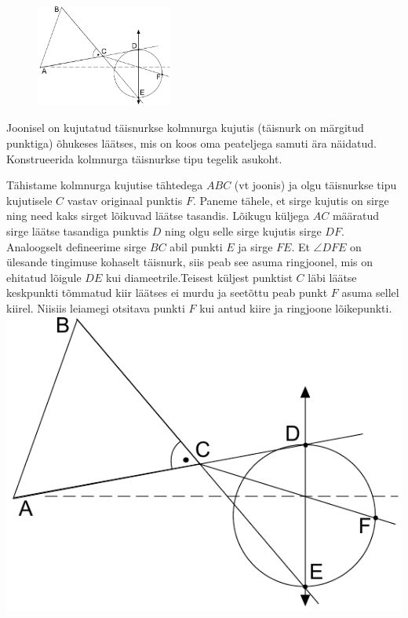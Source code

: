 
\begin{figure}
	\vspace{-30pt}
	\begin{center}
		\hspace{-10pt}
		\includegraphics[width = 0.4\textwidth]{2018-lahg-08-yl.pdf}
	\end{center}
\end{figure}
Joonisel on kujutatud täisnurkse kolmnurga kujutis (täisnurk on märgitud punktiga) õhukeses läätses, mis on koos oma peateljega samuti ära näidatud. Konstrueerida kolmnurga täisnurkse tipu tegelik asukoht.





\hint

\solu
Tähistame kolmnurga kujutise tähtedega $ABC$ (vt joonis) ja olgu täisnurkse tipu kujutisele $C$ vastav originaal punktis $F$. Paneme tähele, et sirge kujutis on sirge ning need kaks sirget lõikuvad läätse tasandis. Lõikugu küljega $AC$ määratud sirge läätse tasandiga punktis $D$ ning olgu selle sirge kujutis sirge $DF$. Analoogselt defineerime sirge 
$BC$ abil punkti $E$ ja sirge $FE$. Et $\angle DFE$ on ülesande tingimuse kohaselt täisnurk, siis peab see asuma ringjoonel, mis on ehitatud lõigule $DE$ kui diameetrile.Teisest küljest punktist $C$ läbi läätse keskpunkti tõmmatud kiir läätses ei murdu ja seetõttu peab punkt $F$ asuma sellel kiirel. Niisiis leiamegi otsitava punkti $F$ kui antud kiire ja ringjoone lõikepunkti. \includegraphics{2018-lahg-08-yl.pdf}
\probend